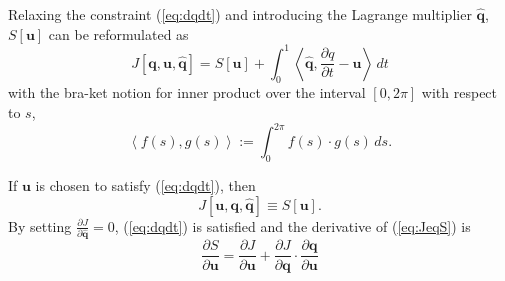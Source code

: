\documentclass[a4paper, 12pt]{article}
\newcommand{\eq}[1]{(\ref{eq:#1})}
\newcommand{\vect}[1]{\ensuremath{\mathbf{#1}}}
\newcommand{\hvect}[1]{\ensuremath{\hat{\vect{#1}}}}
\newcommand{\pp}[2]{\frac{\partial #1}{\partial #2}}
\begin{document}
Relaxing the constraint \eq{dqdt} and introducing the Lagrange multiplier $\hvect q$, $S[\vect u]$ can be reformulated as
\begin{equation}
  \label{eq:J}
  J[\vect q, \vect u, \hvect q] = S[\vect u] + \int^1_0\left\langle \hvect q ,\pp{q}{t} - \vect u\right\rangle \,dt
\end{equation}
with the bra-ket notion for inner product over the interval $[0,2\pi]$ with respect to $s$,
\begin{equation}
  \left\langle f(s),g(s) \right\rangle := \int^{2\pi}_0 f(s) \cdot g(s)\,ds.
\end{equation}

If $\vect u$ is chosen to satisfy \eq{dqdt}, then
\begin{equation}
  \label{eq:JeqS}
  J[\vect u, \vect q, \hvect q] \equiv S[\vect u].
\end{equation}
By setting $\pp{J}{\hvect q} = 0$, \eq{dqdt} is satisfied and the derivative of \eq{JeqS} is
\begin{equation}
  \label{eq:dSeqdJ}
  \pp{S}{\vect u} =  \pp{J}{\vect u} + \pp{J}{\vect q}\cdot\pp{\vect q}{\vect u}
\end{equation}
\end{document}
